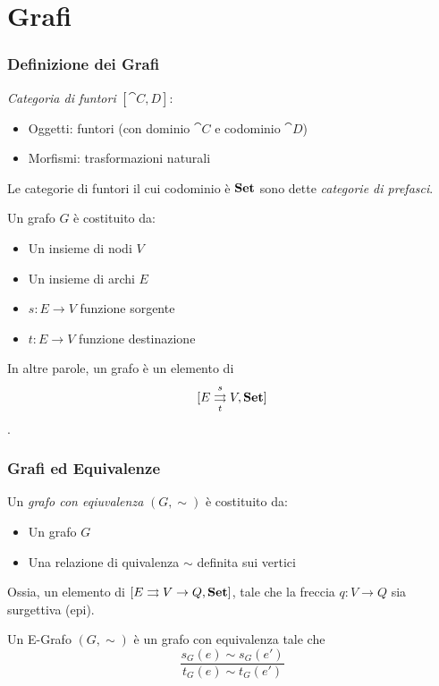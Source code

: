 \documentclass[8pt]{beamer}
\begin{document}
\section{Grafi}

\begin{frame}[fragile]\frametitle{Definizione dei Grafi}

	\emph{Categoria di funtori} $[\cat{C, D}]$:
	\begin{itemize}
		\item Oggetti: funtori (con dominio $\cat C$ e codominio $\cat D$)
		\item Morfismi: trasformazioni naturali
	\end{itemize}
	
	\smallskip

	    Le categorie di funtori il cui codominio è $\mathbf{Set}$ sono dette \emph{categorie di prefasci}.

	    \smallskip


	Un grafo $G$ è costituito da:
	\begin{itemize}
		\item Un insieme di nodi $V$
		\item Un insieme di archi $E$
		\item $s: E \to V$ funzione sorgente
		\item $t: E \to V$ funzione destinazione
	\end{itemize}
	In altre parole, un grafo è un elemento di $$[E \mathrel{\mathop{\rightrightarrows}^{s}_{t}} V , \mathbf{Set}]$$.
\end{frame}

\begin{frame}\frametitle{Grafi ed Equivalenze}
	\begin{wrapfigure}{R}{0.4\textwidth}
	\end{wrapfigure}
	
	Un \emph{grafo con eqiuvalenza} $(G, \sim)$ è costituito da:
	\begin{itemize}
		\item Un grafo $G$
		\item Una relazione di quivalenza $\sim$ definita sui vertici
	\end{itemize}
	Ossia, un elemento di $[E \rightrightarrows V \to Q, \mathbf{Set}]$, tale che la freccia $q: V \to Q$ sia surgettiva (epi).

	Un E-Grafo $(G, \sim)$ è un grafo con equivalenza tale che
	\[
		\frac{s_G(e)\sim s_G(e')}{t_G(e) \sim t_G(e')}
	\]
\end{frame}
\end{document}
